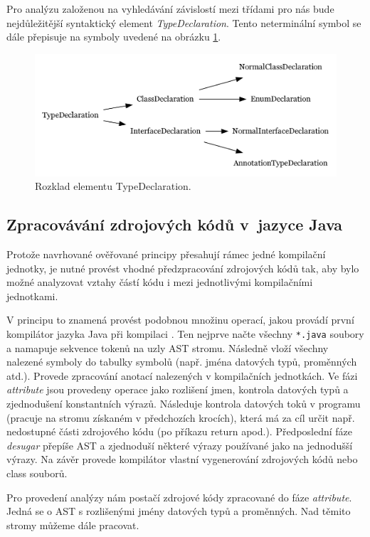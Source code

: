Pro analýzu založenou na vyhledávání závislostí mezi třídami pro nás bude nejdůležitější syntaktický element \emph{TypeDeclaration}. Tento neterminální symbol se dále přepisuje na symboly uvedené na obrázku \ref{type_declaration_options}.

\begin{figure}[h!]
  \centering
  \includegraphics[width=\textwidth]{./graphs/toplevel_types.png}
  \caption{Rozklad elementu TypeDeclaration.\label{type_declaration_options}}
\end{figure}

\subsection{Zpracovávání zdrojových kódů v~jazyce Java}
Protože navrhované ověřované principy přesahují rámec jedné kompilační jednotky, je nutné provést vhodné předzpracování zdrojových kódů tak, aby bylo možné analyzovat vztahy částí kódu i mezi jednotlivými kompilačními jednotkami.

V principu to znamená provést podobnou množinu operací, jakou provádí první kompilátor jazyka Java při kompilaci \cite{hackers_guide_to_javac}. Ten nejprve načte všechny \verb+*.java+ soubory a namapuje sekvence tokenů na uzly AST stromu. Následně vloží všechny nalezené symboly do tabulky symbolů (např. jména datových typů, proměnných atd.). Provede zpracování anotací nalezených v kompilačních jednotkách. Ve fázi \emph{attribute} jsou provedeny operace jako rozlišení jmen, kontrola datových typů a zjednodušení konstantních výrazů. Následuje kontrola datových toků v programu (pracuje na stromu získaném v předchozích krocích), která má za cíl určit např. nedostupné části zdrojového kódu (po příkazu return apod.). Předposlední fáze \emph{desugar} přepíše AST a zjednoduší některé výrazy používané jako  na jednodušší výrazy. Na závěr provede kompilátor vlastní vygenerování zdrojových kódů nebo class souborů.

Pro provedení analýzy nám postačí zdrojové kódy zpracované do fáze \emph{attribute}. Jedná se o AST s rozlišenými jmény datových typů a proměnných. Nad těmito stromy můžeme dále pracovat.

